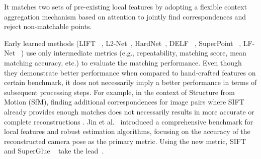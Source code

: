 It matches two sets of pre-existing local features by adopting a flexible context aggregation mechanism based on attention to jointly find correspondences and reject non-matchable points.
\par
Early learned methods (LIFT ~\cite{yi2016lift}, L2-Net~\cite{tian2017l2}, HardNet~\cite{mishchuk2017working}, DELF ~\cite{noh2017DELF}, SuperPoint ~\cite{detone2018superpoint}, LF-Net ~\cite{ono2018lf}) use only intermediate metrics (e.g., repeatability, matching score, mean matching accuracy, etc.) to evaluate the matching performance. 
Even though they demonstrate better performance when compared to hand-crafted features on certain benchmark, it does not necessarily imply a better performance in terms of subsequent processing steps. For example, in the context of Structure from Motion (SfM), finding additional correspondences for image pairs where SIFT already provides enough matches does not necessarily results in more accurate or complete reconstructions \cite{schonberger2017comparative}.
Jin et al.~\cite{jin2020image} introduced a comprehensive benchmark for local features and robust estimation algorithms, focusing on the accuracy of the reconstructed camera pose as the primary metric. Using the new metric, SIFT ~\cite{lowe2004distinctive} and SuperGlue ~\cite{sarlin2020superglue} take the lead~\cite{imagematchingchallenge2020}.

